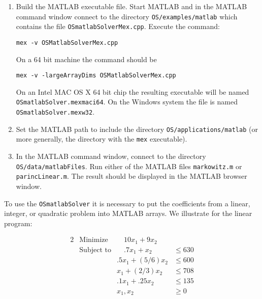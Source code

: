 \begin{enumerate}[{\bf Step 1:}]
\item{}  Build the MATLAB executable file. Start MATLAB and in the MATLAB command window connect to the directory {\tt OS/examples/matlab} which  contains the file {\tt OSmatlabSolverMex.cpp}.    Execute the command:

\begin{verbatim}
mex -v OSMatlabSolverMex.cpp
\end{verbatim}

On a 64 bit machine the command should be

\begin{verbatim}
mex -v -largeArrayDims OSMatlabSolverMex.cpp
\end{verbatim}


On an Intel MAC OS X 64 bit chip the resulting executable will be named {\tt OSmatlabSolver.mexmaci64}. On the Windows system the file is named {\tt OSmatlabSolver.mexw32}.  



\item{}  Set the MATLAB path to include the directory {\tt  OS/applications/matlab}  (or more generally, the directory with the {\tt mex} executable).


\item{}   In the MATLAB command window, connect to the directory {\tt OS/data/matlabFiles}. Run either of the MATLAB
files {\tt markowitz.m} or {\tt parincLinear.m}.  The result should be displayed in the MATLAB browser window.

\end{enumerate}


To use the {\tt OSmatlabSolver} it is necessary to put the coefficients  from a linear, integer, or quadratic problem into MATLAB arrays.   We illustrate for the linear program:

\begin{alignat}{2}
& \mbox{Minimize} & \quad
10 x_{1} + 9 x_{2}\label{eq:parinobj}\\
& \mbox{Subject to} & \quad .7x_{1} + x_{2}  &\le 630  \label{eq:parinccon1}\\
& & .5x_{1} + (5/6) x_{2} &\le 600 \label{eq:parinccon2}\\
& &  x_{1} + (2/3) x_{2} &\le 708 \label{eq:parinccon3}\\
& & .1x_{1} + .25 x_{2} &\le 135 \label{eq:parinccon4}\\
& & x_{1}, x_{2} &\ge 0 \label{eq:parincnonneg}
\end{alignat}


